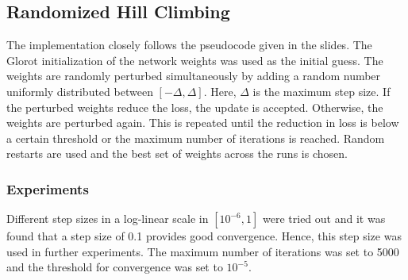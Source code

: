 \documentclass[letterpaper]{article}
\begin{document}
	\subsection{Randomized Hill Climbing}
	The implementation closely follows the pseudocode given in the slides. The Glorot initialization\cite{glorotUnderstandingDifficultyTraining} of the network weights was used as the initial guess. The weights are randomly perturbed simultaneously by adding a random number uniformly distributed between $[-\Delta, \Delta]$. Here, $\Delta$ is the maximum step size. If the perturbed weights reduce the loss, the update is accepted. Otherwise, the weights are perturbed again. This is repeated until the reduction in loss is below a certain threshold or the maximum number of iterations is reached. Random restarts are used and the best set of weights across the runs is chosen.
	
	\subsubsection{Experiments}
	Different step sizes in a log-linear scale in $[10^{-6}, 1]$ were tried out and it was found that a step size of 0.1 provides good convergence. Hence, this step size was used in further experiments. The maximum number of iterations was set to 5000 and the threshold for convergence was set to $10^{-5}$.
	
\end{document}
